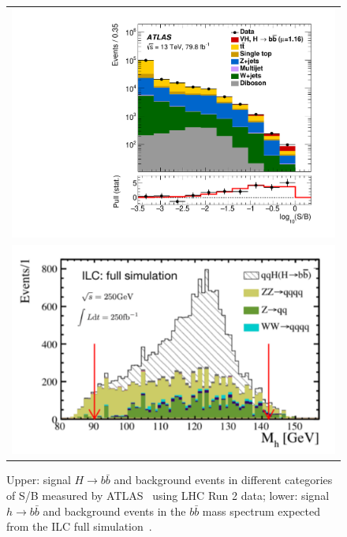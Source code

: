 \begin{figure}
\begin{tabular}[c]{c}
\includegraphics[width=0.85\hsize]{chapters/figures/ATLAS_VH_bb.pdf} \\
\includegraphics[width=0.85\hsize]{chapters/figures/qqH_bb250_ILC.pdf}
\end{tabular}
  \caption{Upper: signal $H\to b\bar{b}$ and background events in different categories of S/B
  measured by ATLAS~\cite{Aaboud:2018zhk,Sirunyan:2018kst} using LHC Run 2 data; lower: signal $h\to b\bar{b}$ 
  and background events in the $b\bar{b}$ mass spectrum expected from the 
  ILC full simulation~\cite{Ogawa:2018}.}
  \label{fig:LHCILCHbb}
\end{figure}




